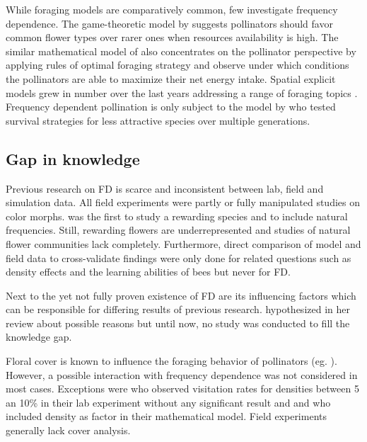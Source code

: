 While foraging models are comparatively common, few investigate frequency dependence. The game-theoretic model by \cite{kunin1996pollinator} suggests pollinators should favor common flower types over rarer ones when resources availability is high. The similar mathematical model of \cite{song2014adaptive} also concentrates on the pollinator perspective by applying rules of optimal foraging strategy and observe under which conditions the pollinators are able to maximize their net energy intake. Spatial explicit models grew in number over the last years addressing a range of foraging topics \citep{dornhaus2006benefits,bukovac2013bees,faruq2013biological}. Frequency dependent pollination is only subject to the model by \cite{hanoteaux2013effects} who tested survival strategies for less attractive species over multiple generations. 


\subsection*{Gap in knowledge}

Previous research on FD is scarce and inconsistent between lab, field and simulation data.
All field experiments were partly or fully manipulated studies on color morphs. \cite{Eckhart2006frequency} was the first to study a rewarding species and to include natural frequencies. Still, rewarding flowers are underrepresented and studies of natural flower communities lack completely.  Furthermore, direct comparison of model and field data to cross-validate findings were only done for related questions such as density effects \citep{essenberg2012explaining} and the learning abilities of bees \citep{dyer2014bee} but never for FD.  

Next to the yet not fully proven existence of FD are its influencing factors which can be responsible for  differing results of previous research. \cite{smithson2001pollinator} hypothesized in her review about possible reasons but until now, no study was conducted to fill the knowledge gap. 

Floral cover is known to influence the foraging behavior of pollinators (eg. \citealt{kunin1993sex,essenberg2012explaining}). However, a possible interaction with  frequency dependence was not considered in most cases. Exceptions were \cite{smithson1997density} who observed visitation rates for densities between 5 an 10\% in their lab experiment without any significant result and \cite{kunin1996pollinator} and \cite{song2014adaptive} who included density as factor in their mathematical model. Field experiments generally lack cover analysis. 


